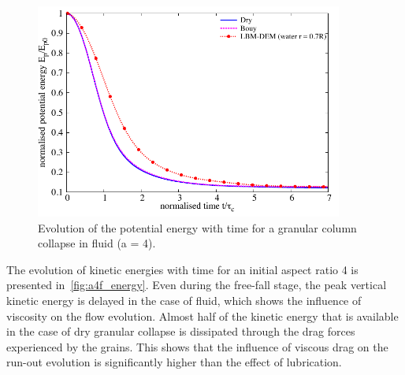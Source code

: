 \begin{figure}
	\centering
    \includegraphics[width=0.9\textwidth]{PE_a4f}
    \caption{Evolution of the potential energy with time for a granular column 
    collapse in fluid (a = 4).}
    \label{fig:PE_a4f}
\end{figure}

The evolution of kinetic energies with time for an initial aspect ratio 4 is 
presented in~\cref{fig:a4f_energy}. Even during the free-fall stage, the peak 
vertical kinetic energy is delayed in the case of fluid, which shows the 
influence of viscosity on the flow evolution. Almost half of the kinetic energy 
that is available in the case of dry granular collapse is dissipated through 
the drag forces experienced by the grains. This shows that the influence of 
viscous drag on the run-out evolution is significantly higher than the effect 
of lubrication.

